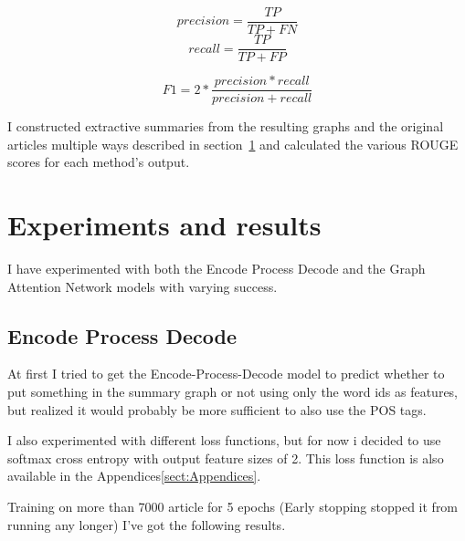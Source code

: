 \[precision = \frac{TP}{TP + FN}\]
\[recall = \frac{TP}{TP + FP}\]

\[F1 = 2 * \frac{precision * recall}{precision + recall}\]

I constructed extractive summaries from the resulting graphs and the original articles multiple ways described in section~\ref{ssect:ExperimnetsAndResults} and calculated the various ROUGE scores for each method's output.

\section{Experiments and results}\label{ssect:ExperimnetsAndResults}
I have experimented with both the Encode Process Decode and the Graph Attention Network models with varying success.
\subsection{Encode Process Decode}
At first I tried to get the Encode-Process-Decode model to predict whether to put something in the summary graph or not using only the word ids as features, but realized it would probably be more sufficient to also use the POS tags.

I also experimented with different loss functions, but for now i decided to use
softmax cross entropy with output feature sizes of 2. This loss function is
also available in the Appendices\ref{sect:Appendices}.


Training on more than 7000 article for 5 epochs (Early stopping stopped it from running any longer) I've got the following results.

